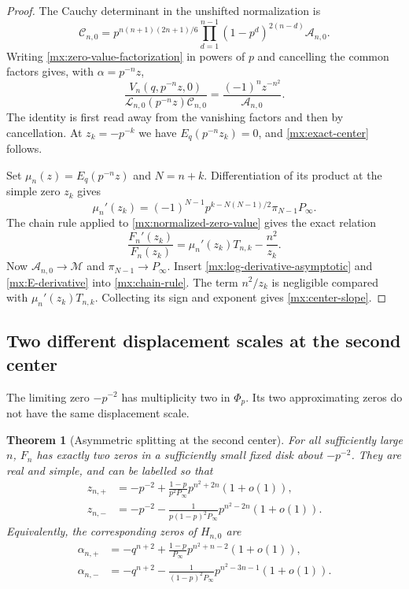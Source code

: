 \documentclass[11pt]{article}
\numberwithin{equation}{section}
\newtheorem{theorem}{Theorem}[section]
\theoremstyle{definition}
\theoremstyle{remark}
\begin{document}
\begin{proof}
The Cauchy determinant in the unshifted normalization is
\[
 \mathcal C_{n,0}
 =p^{n(n+1)(2n+1)/6}
 \prod_{d=1}^{n-1}(1-p^d)^{2(n-d)}\mathcal A_{n,0}.
\]
Writing \eqref{mx:zero-value-factorization} in powers of $p$ and
cancelling the common factors gives, with $\alpha=p^{-n}z$,
\begin{equation}\label{mx:normalized-zero-value}
 \frac{V_n(q,p^{-n}z,0)}
 {\mathcal L_{n,0}(p^{-n}z)\mathcal C_{n,0}}
 =\frac{(-1)^nz^{-n^2}}{\mathcal A_{n,0}}.
\end{equation}
The identity is first read away from the vanishing factors and
then by cancellation.  At $z_k=-p^{-k}$ we have
$E_q(p^{-n}z_k)=0$, and \eqref{mx:exact-center} follows.

Set $\mu_n(z)=E_q(p^{-n}z)$ and $N=n+k$.
Differentiation of its product at the simple zero $z_k$ gives
\begin{equation}\label{mx:E-derivative}
 \mu_n'(z_k)
 =(-1)^{N-1}p^{k-N(N-1)/2}\pi_{N-1}P_\infty.
\end{equation}
The chain rule applied to \eqref{mx:normalized-zero-value} gives the
exact relation
\begin{equation}\label{mx:chain-rule}
 \frac{F_n'(z_k)}{F_n(z_k)}
 =\mu_n'(z_k)T_{n,k}-\frac{n^2}{z_k}.
\end{equation}
Now $\mathcal A_{n,0}\to\mathcal M$ and
$\pi_{N-1}\to P_\infty$.
Insert \eqref{mx:log-derivative-asymptotic} and
\eqref{mx:E-derivative} into \eqref{mx:chain-rule}.
The term $n^2/z_k$ is negligible compared with
$\mu_n'(z_k)T_{n,k}$.  Collecting its sign and exponent gives
\eqref{mx:center-slope}.
\end{proof}

\subsection{Two different displacement scales at the second center}

The limiting zero $-p^{-2}$ has multiplicity two in $\Phi_p$.
Its two approximating zeros do not have the same displacement scale.

\begin{theorem}[Asymmetric splitting at the second center]
\label{mx:double-splitting}
For all sufficiently large $n$, $F_n$ has exactly two zeros in a
sufficiently small fixed disk about $-p^{-2}$.
They are real and simple, and can be labelled so that
\begin{align}
 z_{n,+}
 &=-p^{-2}
 +\frac{1-p}{p^2P_\infty}
 p^{n^2+2n}(1+o(1)),\label{mx:near-root}\\
 z_{n,-}
 &=-p^{-2}
 -\frac{1}{p(1-p)^2P_\infty}
 p^{n^2-2n}(1+o(1)).\label{mx:far-root}
\end{align}
Equivalently, the corresponding zeros of $H_{n,0}$ are
\begin{align}
 \alpha_{n,+}
 &=-q^{n+2}
 +\frac{1-p}{P_\infty}
 p^{n^2+n-2}(1+o(1)),\label{mx:near-alpha}\\
 \alpha_{n,-}
 &=-q^{n+2}
 -\frac{1}{(1-p)^2P_\infty}
 p^{n^2-3n-1}(1+o(1)).\label{mx:far-alpha}
\end{align}
\end{theorem}
\end{document}
